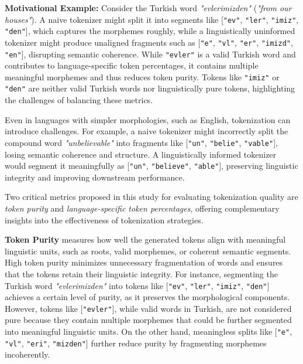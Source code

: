 \textbf{Motivational Example:} Consider the Turkish word \textit{"evlerimizden"} (\textit{"from our houses"}). A naive tokenizer might split it into segments like [\texttt{"ev"}, \texttt{"ler"}, \texttt{"imiz"}, \texttt{"den"}], which captures the morphemes roughly, while a linguistically uninformed tokenizer might produce unaligned fragments such as [\texttt{"e"}, \texttt{"vl"}, \texttt{"er"}, \texttt{"imizd"}, \texttt{"en"}], disrupting semantic coherence. While \texttt{"evler"} is a valid Turkish word and contributes to language-specific token percentages, it contains multiple meaningful morphemes and thus reduces token purity. Tokens like \texttt{"imiz"} or \texttt{"den"} are neither valid Turkish words nor linguistically pure tokens, highlighting the challenges of balancing these metrics.

Even in languages with simpler morphologies, such as English, tokenization can introduce challenges. For example, a naive tokenizer might incorrectly split the compound word \textit{"unbelievable"} into fragments like [\texttt{"un"}, \texttt{"belie"}, \texttt{"vable"}], losing semantic coherence and structure. A linguistically informed tokenizer would segment it meaningfully as [\texttt{"un"}, \texttt{"believe"}, \texttt{"able"}], preserving linguistic integrity and improving downstream performance.

Two critical metrics proposed in this study for evaluating tokenization quality are \textit{token purity} and \textit{language-specific token percentages}, offering complementary insights into the effectiveness of tokenization strategies.

\textbf{Token Purity} measures how well the generated tokens align with meaningful linguistic units, such as roots, valid morphemes, or coherent semantic segments. High token purity minimizes unnecessary fragmentation of words and ensures that the tokens retain their linguistic integrity. For instance, segmenting the Turkish word \textit{"evlerimizden"} into tokens like [\texttt{"ev"}, \texttt{"ler"}, \texttt{"imiz"}, \texttt{"den"}] achieves a certain level of purity, as it preserves the morphological components. However, tokens like [\texttt{"evler"}], while valid words in Turkish, are not considered pure because they contain multiple morphemes that could be further segmented into meaningful linguistic units. On the other hand, meaningless splits like [\texttt{"e"}, \texttt{"vl"}, \texttt{"eri"}, \texttt{"mizden"}] further reduce purity by fragmenting morphemes incoherently.

